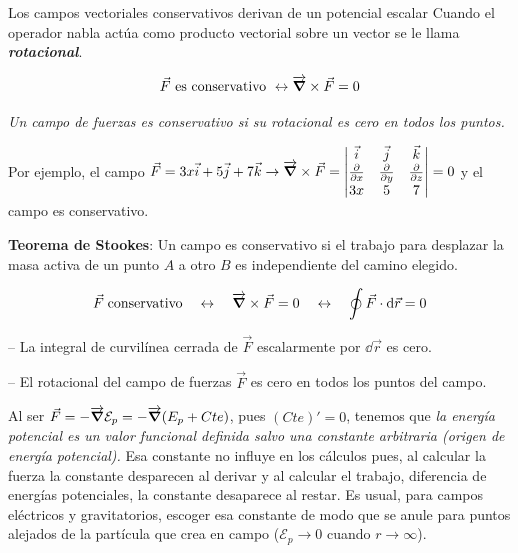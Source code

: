 \begin{small}
\begin{myexampleblock}{Los campos vectoriales conservativos derivan de un potencial escalar}
\vspace{2mm} Cuando el operador nabla actúa como producto vectorial sobre un vector se le llama \textbf{\emph{rotacional}}.


\vspace{2mm} $$\vec F \text{ es conservativo } \leftrightarrow \overrightarrow{\grad } \times \vec F = 0$$ 

\vspace{2mm} \emph{Un campo de fuerzas es conservativo si su rotacional es cero en todos los puntos.}

\vspace{2mm} \textcolor{gris}{Por ejemplo, el campo $\vec F=3x\vec i+5\vec j+7\vec k \to \overrightarrow{\grad } \times \vec F = \left| \begin{matrix} \vec i&\vec j&\vec k \\ \pdv{x}&\pdv{y}&\pdv{z} \\ 3x&5&7  \end{matrix} \right|=0$ y el campo es conservativo}.

\vspace{2mm} \textbf{Teorema de Stookes}: Un campo es conservativo si el trabajo para desplazar la masa activa de un punto $A$ a otro $B$ es independiente del camino elegido.

\begin{equation}
\label{Th-Stookes}
	\vec F \text{\;conservativo} \quad \leftrightarrow \quad  \overrightarrow{\grad } \times \vec F = 0 \quad \leftrightarrow \quad \oint \vec F \cdot \dd \vec r =0
\end{equation}

\vspace{2mm} -- La integral de curvilínea cerrada de $\vec F$ escalarmente por $\dd \vec r$ es cero.

\vspace{2mm} -- El rotacional del campo de fuerzas $\vec F$ es cero en todos los puntos del campo.

\vspace{2mm} Al ser $\vec F=- \overrightarrow{\grad} \mathcal E_p = - \overrightarrow{\grad} \mathcal (E_p+ Cte)$, pues $(Cte)'=0$, tenemos que \emph{la energía potencial es un valor funcional definida salvo una constante arbitraria (origen de energía potencial).} Esa constante no influye en los cálculos pues, al calcular la fuerza la constante desparecen al derivar y al calcular el trabajo, diferencia de energías potenciales, la constante desaparece al restar. Es usual, para campos eléctricos y gravitatorios, escoger esa constante de modo que se anule para puntos alejados de la partícula que crea en campo ($\mathcal E_p \to 0$ cuando $r\to \infty$).
 

\end{myexampleblock}
\end{small}
